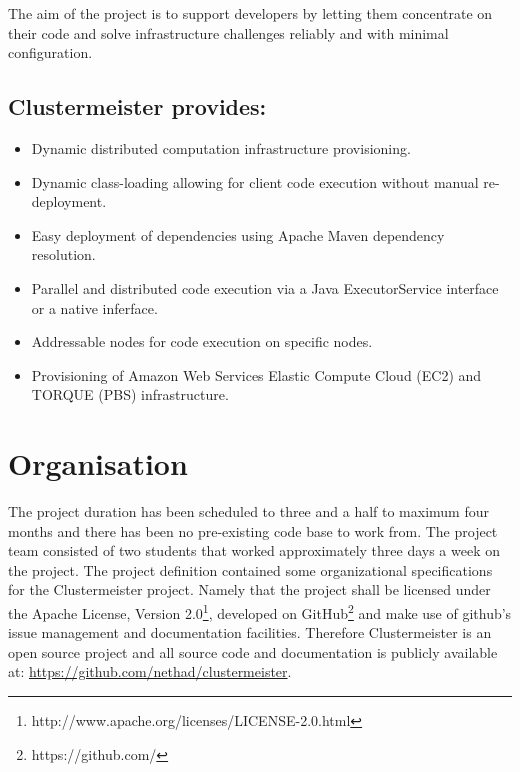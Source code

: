 \documentclass{article}
\begin{document}
The aim of the project is to support developers by letting them concentrate on their code and solve infrastructure challenges reliably and with minimal configuration.

\subsection*{Clustermeister provides:}
\begin{itemize}
\item Dynamic distributed computation infrastructure provisioning.
\item Dynamic class-loading allowing for client code execution without manual re-deployment.
\item Easy deployment of dependencies using Apache Maven dependency resolution.
\item Parallel and distributed code execution via a Java ExecutorService interface or a native inferface.
\item Addressable nodes for code execution on specific nodes.
\item Provisioning of Amazon Web Services Elastic Compute Cloud (EC2) and TORQUE (PBS) infrastructure.
\end{itemize}

\section{Organisation}

The project duration has been scheduled to three and a half to maximum four months and there has been no pre-existing code base to work from. The project team consisted of two students that worked approximately three days a week on the project. The project definition contained some organizational specifications for the Clustermeister project. Namely that the project shall be licensed under the Apache License, Version 2.0\footnote{http://www.apache.org/licenses/LICENSE-2.0.html}, developed on GitHub\footnote{https://github.com/} and make use of github's issue management and documentation facilities. Therefore Clustermeister is an open source project and all source code and documentation is publicly available at: \url{https://github.com/nethad/clustermeister}.
\end{document}
